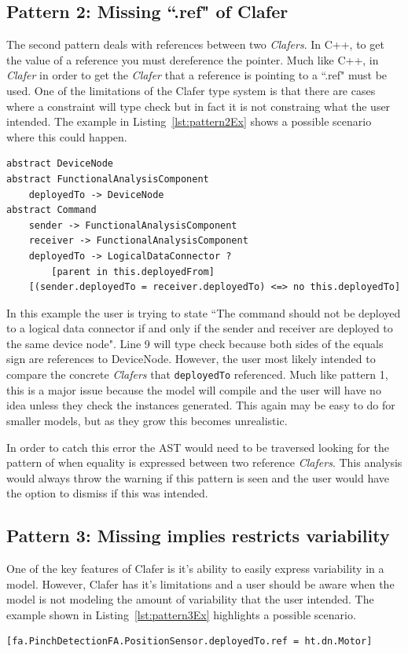\documentclass[10pt,oneside]{IEEEtran}
\begin{document}
\subsection{Pattern 2: Missing ``.ref" of Clafer}
The second pattern deals with references between two \textit{Clafers}. In C++, to get the value of a reference you must dereference the pointer. Much like C++, in \textit{Clafer} in order to get the \textit{Clafer} that a reference is pointing to a ``.ref" must be used. One of the limitations of the Clafer type system is that there are cases where a constraint will type check but in fact it is not constraing what the user intended. The example in Listing~\ref{lst:pattern2Ex} shows a possible scenario where this could happen.
\begin{lstlisting}[label={lst:pattern2Ex},caption={Example of Pattern 2},numbers=right]
abstract DeviceNode
abstract FunctionalAnalysisComponent
    deployedTo -> DeviceNode
abstract Command
    sender -> FunctionalAnalysisComponent
    receiver -> FunctionalAnalysisComponent
    deployedTo -> LogicalDataConnector ?
        [parent in this.deployedFrom]
    [(sender.deployedTo = receiver.deployedTo) <=> no this.deployedTo]
\end{lstlisting}

In this example the user is trying to state ``The command should not be deployed to a logical data connector if and only if the sender and receiver are deployed to the same device node". Line 9 will type check because both sides of the equals sign are references to DeviceNode. However, the user most likely intended to compare the concrete \textit{Clafers} that \lstinline$deployedTo$ referenced. Much like pattern 1, this is a major issue because the model will compile and the user will have no idea unless they check the instances generated. This again may be easy to do for smaller models, but as they grow this becomes unrealistic.

In order to catch this error the AST would need to be traversed looking for the pattern of when equality is expressed between two reference \textit{Clafers}. This analysis would always throw the warning if this pattern is seen and the user would have the option to dismiss if this was intended.
\subsection{Pattern 3: Missing implies restricts variability}
One of the key features of Clafer is it's ability to easily express variability in a model. However, Clafer has it's limitations and a user should be aware when the model is not modeling the amount of variability that the user intended. The example shown in Listing~\ref{lst:pattern3Ex} highlights a possible scenario.
\begin{lstlisting}[label={lst:pattern3Ex},caption={Example of Pattern 3}]
[fa.PinchDetectionFA.PositionSensor.deployedTo.ref = ht.dn.Motor]
\end{lstlisting}
\end{document}
